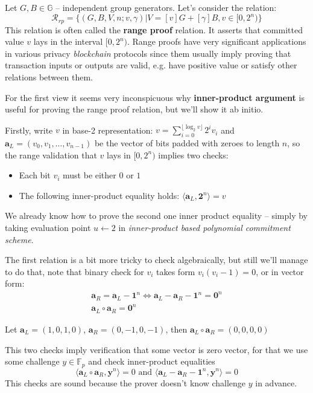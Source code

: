 \documentclass[../lecture-notes-148x210.tex]{subfiles}
\begin{document}
Let $G,B\in \mathbb{G}$ -- independent group generators. Let's consider the relation: 
$$\mathcal{R}_{rp} = \{ (G, B, V, n; v, \gamma) \vert V = [v]G + [\gamma]B, v \in [0, 2^n) \}$$ 
This relation is often called the \textbf{range proof} relation. It asserts that committed value $v$ lays in the interval $[0, 2^n)$. Range proofs have very significant applications in various privacy \textit{blockchain} protocols since them usually imply proving that transaction inputs or outputs are valid, e.g. have positive value or satisfy other relations between them.

For the first view it seems very inconspicuous why \textbf{inner-product argument} is useful for proving the range proof relation, but we'll show it ab initio.

Firstly, write $v$ in base-2 representation: $v = \sum_{i=0}^{\lfloor \log_2 v \rfloor} 2^i v_i$ and $\mathbf{a}_L = (v_0, v_1, \dots, v_{n-1})$ be the vector of bits padded with zeroes to length $n$, so the range validation that $v$ lays in $[0, 2^n)$ implies two checks:
\begin{itemize}
    \item Each bit $v_i$ must be either $0$ or $1$
    \item The following inner-product equality holds: $\langle \mathbf{a}_L, \mathbf{2}^n \rangle = v$
\end{itemize}

We already know how to prove the second one inner product equality -- simply by taking evaluation point $u \gets 2$ in \textit{inner-product based polynomial commitment scheme}.

The first relation is a bit more tricky to check algebraically, but still we'll manage to do that, note that binary check for $v_i$ takes form $v_i(v_i - 1) = 0$, or in vector form:
\begin{align*}
    \mathbf{a}_R = \mathbf{a}_L - \mathbf{1}^n \Leftrightarrow  \mathbf{a}_L - \mathbf{a}_R - \mathbf{1}^n = \mathbf{0}^n \\
    \mathbf{a}_L \circ \mathbf{a}_R = \mathbf{0}^n
\end{align*}

\begin{example}
    Let $\mathbf{a}_L = (1, 0, 1, 0)$, $\mathbf{a}_R = (0, -1, 0, -1)$, then 
    $\mathbf{a}_L \circ \mathbf{a}_R = (0, 0, 0, 0)$
\end{example}

This two checks imply verification that some vector is zero vector, for that we use some challenge $y \in \mathbb{F}_p$ and check inner-product equalities $$\langle \mathbf{a}_L \circ \mathbf{a}_R, \mathbf{y}^n \rangle = 0 \text{ and } \langle \mathbf{a}_L - \mathbf{a}_R - \mathbf{1}^n, \mathbf{y}^n \rangle = 0$$
This checks are sound because the prover doesn't know challenge $y$ in advance.
\end{document}
